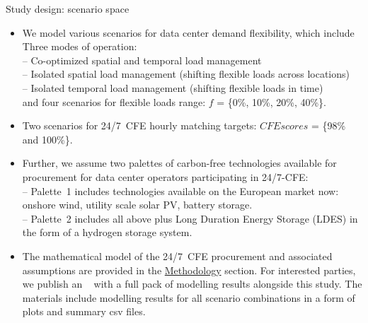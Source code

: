 \begin{frame}{Study design: scenario space}

  {\footnotesize 
  \begin{itemize}
  \vspace{-0.2cm}
  \item We model various scenarios for data center demand flexibility, which include \\
  \vspace{0.1cm}
  Three modes of operation: \\
    -- Co-optimized \alert{spatial and temporal} load management \\
    -- Isolated \alert{spatial} load management (shifting flexible loads across locations)\\ 
    -- Isolated \alert{temporal} load management (shifting flexible loads in time) \\ 
  \vspace{0.1cm}
  and four scenarios for flexible loads range: \alert{$f$ = \{0\%, 10\%, 20\%, 40\%\}}.

  \item Two scenarios for 24/7~CFE hourly matching targets:
  \alert{$CFE scores$ = \{98\% and 100\%\}}.
  
  \item Further, we assume two palettes of carbon-free technologies available for procurement for data center operators participating in 24/7-CFE: \\
  \vspace{0.1cm}
  -- \alert{Palette~1} includes technologies available on the European market now: onshore wind, utility scale solar PV, battery storage. \\
  -- \alert{Palette~2} includes all above plus Long Duration Energy Storage (LDES) in the form of a hydrogen storage system. \\
 
  \item The mathematical model of the 24/7~CFE procurement and associated assumptions are provided in the \hyperlink{CFEmodel}{Methodology} section. For interested parties, we publish an \faLink~ with a full pack of modelling results alongside this study. The materials include modelling results for all scenario combinations in a form of plots and summary csv files. 

  \end{itemize}
  }
\end{frame}




